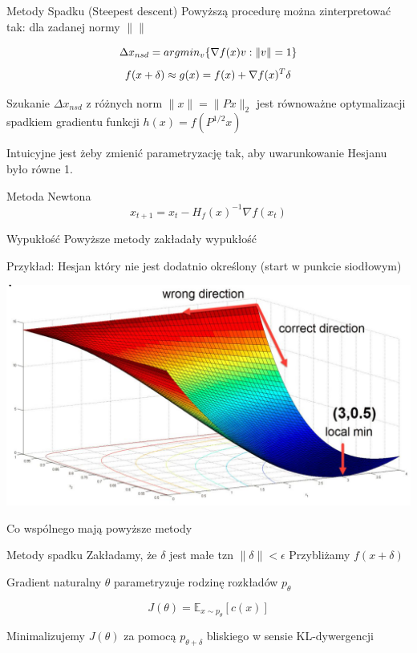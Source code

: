 \documentclass[unknownkeysallowed]{beamer}
\begin{document}
\begin{frame}{Metody Spadku (Steepest descent)}
  Powyższą procedurę można zinterpretować tak: dla zadanej normy $\| \|$

  $$\Delta x_{nsd} = argmin_v \{\nabla f(x) v : \|v\| = 1 \}$$ 
  $$f(x + \delta) \approx g(x) = f(x) + \nabla f(x)^T \delta $$
  
  Szukanie $\Delta x_{nsd}$ z różnych norm $\|x\| = \|Px\|_2$ jest równoważne optymalizacji spadkiem gradientu funkcji $h(x) = f(P^{1/2}x)$ \pause
  

  Intuicyjne jest żeby zmienić parametryzację tak, aby uwarunkowanie Hesjanu było równe 1.
  \begin{block}{Metoda Newtona}
  $$x_{t+1} = x_t - H_f(x)^{-1} \nabla f(x_t)$$
  \end{block}

\end{frame}

\begin{frame}{Wypukłość}
  Powyższe metody zakładały wypukłość 

  Przykład: Hesjan który nie jest dodatnio określony (start w punkcie siodłowym)

 \includegraphics[width=\textwidth]{Niewypukla.jpg} 
\end{frame}

\begin{frame}{Co wspólnego mają powyższe metody}
  \begin{block}{Metody spadku}
  Zakładamy, że $\delta$ jest małe tzn $\| \delta \| < \epsilon$
  Przybliżamy $f(x + \delta)$
  \end{block}

  \begin{block}{Gradient naturalny}
    $\theta$ parametryzuje rodzinę rozkładów $p_{\theta}$

    $$J(\theta) = \mathbb{E}_{x \sim p_{\theta}}[c(x)]$$

    Minimalizujemy $J(\theta)$ za pomocą $p_{\theta + \delta}$ bliskiego w sensie KL-dywergencji
  \end{block}
\end{frame}
\end{document}
